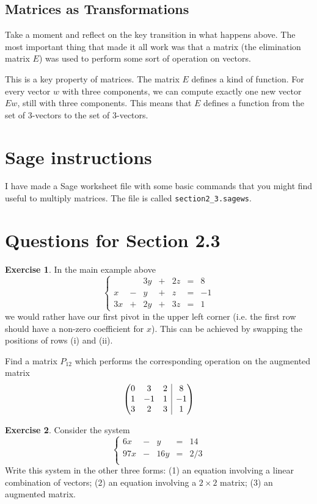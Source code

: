 \documentclass[11pt]{amsart}
\makeatletter
\theoremstyle{definition}
\newtheorem{exercise}{Exercise}
\newenvironment{amatrix}[1]{%
  \left(\begin{array}{@{}*{#1}{c}|c@{}}
}{%
  \end{array}\right)
}
\makeatother
\begin{document}
\subsection*{Matrices as Transformations}

Take a moment and reflect on the key transition in what happens above. The most important thing that made it all work was that a matrix (the elimination matrix $E$) was used to perform some sort of operation on vectors.

This is a key property of matrices. The matrix $E$ defines a kind of function. For every vector $w$ with three components, we can compute exactly one new vector $Ew$, still with three components. This means that $E$ defines a function from the set of $3$-vectors to the set of $3$-vectors.


\section{Sage instructions}

I have made a Sage worksheet file with some basic commands that you might find useful to multiply matrices. The file is called \texttt{section2\_3.sagews}.


\section{Questions for Section 2.3}
\setcounter{exercise}{44}

\begin{exercise}
In the main example above
\[
\left\{ \begin{array}{rrrrrrr}
   &   & 3y & + & 2z & = & 8 \\
 x & - &  y & + &  z & = & -1 \\
3x & + & 2y & + & 3z & = & 1
\end{array}
\right.
\]
we would rather have our first pivot in the upper left corner (i.e. the first row should have a non-zero coefficient for $x$). This can be achieved by swapping the positions of rows (i) and (ii).

Find a matrix $P_{12}$ which performs the corresponding operation on the augmented matrix
\[
\begin{amatrix}{3}
0 & 3 & 2 & 8 \\ 1 & -1 & 1 & -1 \\ 3 & 2 & 3 & 1
\end{amatrix}
\]
\end{exercise}


\begin{exercise}\label{exercise:2d-sys}
Consider the system
\[
\left\{ \begin{array}{rrrrr}
6x & - & y & = & 14 \\
97x & - & 16y & = & 2/3 \\
\end{array}
\right.
\]
Write this system in the other three forms: (1) an equation involving a linear combination of vectors; (2) an equation involving a $2\times 2$ matrix; (3) an augmented matrix.
\end{exercise}
\end{document}

